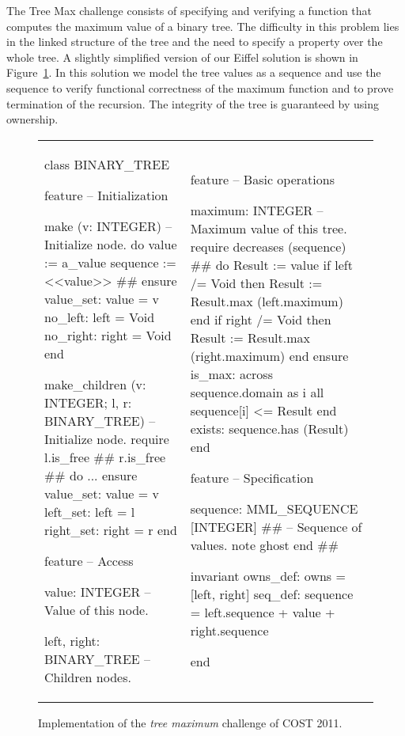The Tree Max challenge consists of specifying and verifying a function that computes the maximum value of a binary tree. The difficulty in this problem lies in the linked structure of the tree and the need to specify a property over the whole tree. A slightly simplified version of our Eiffel solution is shown in Figure~\ref{fig:code:maxtree}. In this solution we model the tree values as a sequence and use the sequence to verify functional correctness of the maximum function and to prove termination of the recursion. The integrity of the tree is guaranteed by using ownership.


\begin{figure}[!ht]
\begin{tabular}{ll}
{\begin{erunning}[basicstyle=\footnotesize,numbers=left]
class BINARY_TREE

feature -- Initialization

	make (v: INTEGER)
			-- Initialize node.
		do
			value := a_value
			sequence := <<value>> #\label{l:maxtree:seq_init}#
		ensure
			value_set: value = v
			no_left: left = Void
			no_right: right = Void
		end

	make_children (v: INTEGER;
						l, r: BINARY_TREE)
			-- Initialize node.
		require
			l.is_free #\label{l:maxtree:l_free}#
			r.is_free #\label{l:maxtree:r_free}#
		do ... ensure
			value_set: value = v
			left_set: left = l
			right_set: right = r
		end

feature -- Access

	value: INTEGER
			-- Value of this node.

	left, right: BINARY_TREE
			-- Children nodes.
\end{erunning}}
&
\hspace{4mm}
{\begin{erunning}[basicstyle=\footnotesize,numbers=left,firstnumber=last]
feature -- Basic operations

	maximum: INTEGER
			-- Maximum value of this tree.
		require
			decreases (sequence) #\label{l:maxtree:decreases}#
		do
			Result := value
			if left /= Void then
				Result := 
						Result.max (left.maximum)
			end
			if right /= Void then
				Result := 
						Result.max (right.maximum)
			end
		ensure
			is_max: across sequence.domain as i 
								all sequence[i] <= Result end
			exists: sequence.has (Result)
		end

feature -- Specification

	sequence: MML_SEQUENCE [INTEGER] #\label{l:maxtree:seq}#
			-- Sequence of values.
		note ghost end #\label{l:maxtree:ghost_note}#

invariant
	owns_def: owns = [left, right]
	seq_def: sequence = left.sequence + 
			value + right.sequence

end
\end{erunning}}
\end{tabular}
\caption{Implementation of the \emph{tree maximum} challenge of COST 2011.}
\label{fig:code:maxtree}
\end{figure}


